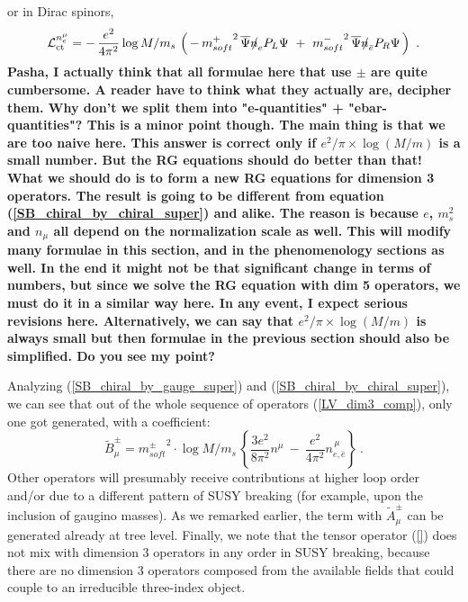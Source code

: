 \documentclass[paper,12pt]{revtex4}
\newcommand{\slashed}[1]{\hbox{{$#1$}\llap{$/$}}}
\begin{document}
	or in Dirac spinors,
\begin{equation}
\label{SB_chiral_by_chiral}
	\mathcal{L}_{\rm ct}^{n_e^\mu} = 
	-\, \frac{e^2}
		 {4\pi^2} \log M/m_s\,
	\left(\,
		-\, {m_{soft}^+}^2\, 
		\overline{\Psi} \slashed{n}_e P_L \Psi
		~+~
		{m_{soft}^-}^2\,
		\overline{\Psi} \slashed{n}_{\bar{e}} P_R \Psi
		\,
	\right)~.
\end{equation}
{\bf Pasha, I actually think that all formulae here that  use $\pm$ are quite 
cumbersome. A reader have to think what they actually are, decipher them. 
Why don't we split them into "e-quantities" + "ebar-quantities"? This is a minor point though.
The main thing is that we are too naive here. This answer is correct only if 
$e^2/\pi \times \log (M/m)$ is a small number.  But the RG equations should do better than that!
What we should do is to form a new RG equations 
for dimension 3 operators. The result is going to be different from equation 
(\ref{SB_chiral_by_chiral_super}) and alike. The reason is because $e$, $m_s^2$ and $n_\mu$ 
all depend on the normalization scale as well. This will modify many formulae in 
this section, and in the phenomenology sections as well. In the end it might not be that significant 
change in terms of numbers, but since we solve the RG equation with dim 5 operators, we must
do it in a similar way here. In any event, I expect serious revisions here. 
Alternatively, we can say that $e^2/\pi \times \log (M/m)$ is always small but then 
formulae in the previous section should also be simplified. Do you see my point?}

        Analyzing (\ref{SB_chiral_by_gauge_super}) 
	and (\ref{SB_chiral_by_chiral_super}),
	we can see that out of the whole sequence of operators
	(\ref{LV_dim3_comp}), only one got generated, with a 
	coefficient:
\begin{equation}
\label{B_mu_coef}
	\widetilde{B}^\pm_\mu = 
	{m_{soft}^\pm}^2 \cdot \log M/m_s\,
	\left \{ 
		\frac{3e^2}
		     {8\pi^2} n^\mu 
		~-~
		\frac{e^2}
		     {4\pi^2} n_{e,\bar{e}}^{\,\mu}
	\right \}~.
\end{equation}
Other operators will presumably receive contributions at higher loop order
and/or due to a different pattern of SUSY breaking (for example, upon the inclusion of gaugino masses). 
        As we remarked earlier, the term with $ \widetilde{A}^\pm_\mu $ can be generated already 
      at tree level. Finally, we note that the tensor operator (\ref{}) does not mix with 
      dimension 3 operators in any order in SUSY breaking, because there are no dimension 3 operators 
      composed from the available fields that could couple to an irreducible three-index object.  
\end{document}
